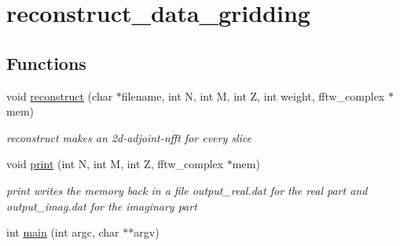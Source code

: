 \hypertarget{group__applications__mri3d__reconstruct__data__gridding}{
\section{reconstruct\_\-data\_\-gridding}
\label{group__applications__mri3d__reconstruct__data__gridding}
}
\subsection*{Functions}
\begin{CompactItemize}
\item 
\hypertarget{group__applications__mri3d__reconstruct__data__gridding_gb4dee936f9cce57a8310d100b35189ce}{
void \hyperlink{group__applications__mri3d__reconstruct__data__gridding_gb4dee936f9cce57a8310d100b35189ce}{reconstruct} (char $\ast$filename, int N, int M, int Z, int weight, fftw\_\-complex $\ast$mem)}
\label{group__applications__mri3d__reconstruct__data__gridding_gb4dee936f9cce57a8310d100b35189ce}

\begin{CompactList}\small\item\em reconstruct makes an 2d-adjoint-nfft for every slice \item\end{CompactList}\item 
\hypertarget{group__applications__mri3d__reconstruct__data__gridding_g2794364dedbb67a9984208e6f11aec81}{
void \hyperlink{group__applications__mri3d__reconstruct__data__gridding_g2794364dedbb67a9984208e6f11aec81}{print} (int N, int M, int Z, fftw\_\-complex $\ast$mem)}
\label{group__applications__mri3d__reconstruct__data__gridding_g2794364dedbb67a9984208e6f11aec81}

\begin{CompactList}\small\item\em print writes the memory back in a file output\_\-real.dat for the real part and output\_\-imag.dat for the imaginary part \item\end{CompactList}\item 
\hypertarget{group__applications__mri3d__reconstruct__data__gridding_g3c04138a5bfe5d72780bb7e82a18e627}{
int \hyperlink{group__applications__mri3d__reconstruct__data__gridding_g3c04138a5bfe5d72780bb7e82a18e627}{main} (int argc, char $\ast$$\ast$argv)}
\label{group__applications__mri3d__reconstruct__data__gridding_g3c04138a5bfe5d72780bb7e82a18e627}

\end{CompactItemize}
